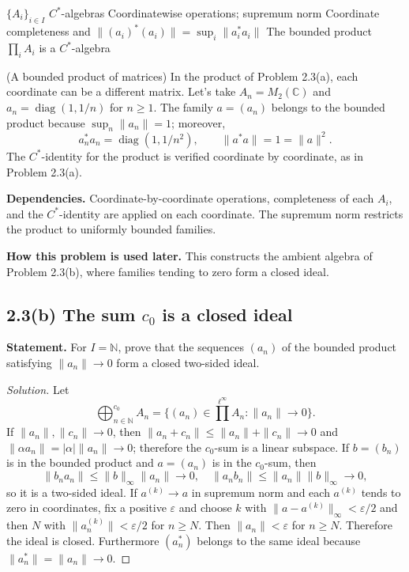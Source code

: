 \proofdiagram
{$\{A_i\}_{i\in I}$ $C^*$-algebras}
{Coordinatewise operations; supremum norm}
{Coordinate completeness and $\|(a_i)^*(a_i)\|=\sup_i\|a_i^*a_i\|$}
{The bounded product $\prod_i A_i$ is a $C^*$-algebra}

\begin{cthejemplo}{(A bounded product of matrices)}
In the product of Problem 2.3(a), each coordinate can be a different matrix.
Let's take $A_n=M_2(\mathbb C)$ and $a_n=\operatorname{diag}(1,1/n)$ for $n\ge1$.
The family $a=(a_n)$ belongs to the bounded product because $\sup_n\|a_n\|=1$; moreover,
\[
 a_n^*a_n=\operatorname{diag}(1,1/n^2),
 \qquad \|a^*a\|=1=\|a\|^2.
\]
The $C^*$-identity for the product is verified coordinate by coordinate, as in Problem 2.3(a).
\end{cthejemplo}

\noindent\textbf{Dependencies.} Coordinate-by-coordinate operations, completeness of each $A_i$, and the $C^*$-identity are applied on each coordinate. The supremum norm restricts the product to uniformly bounded families.

\noindent\textbf{How this problem is used later.} This constructs the ambient algebra of Problem 2.3(b), where families tending to zero form a closed ideal.

\subsection*{2.3(b) The sum $c_0$ is a closed ideal}

\noindent\textbf{Statement.} For $I=\mathbb N$, prove that the sequences $(a_n)$ of the bounded product satisfying $\|a_n\|\to0$ form a closed two-sided ideal.

\begin{proof}[Solution]
Let
\[
\bigoplus_{n\in\mathbb N}^{c_0}A_n
=\{(a_n)\in\prod^{\ell^\infty}A_n:\|a_n\|\to0\}.
\]
If $\|a_n\|,\|c_n\|\to0$, then
$\|a_n+c_n\|\le\|a_n\|+\|c_n\|\to0$ and
$\|\alpha a_n\|=|\alpha|\|a_n\|\to0$; therefore the $c_0$-sum is a linear subspace.
If $b=(b_n)$ is in the bounded product and $a=(a_n)$ is in the $c_0$-sum, then
\[
\|b_na_n\|\le\|b\|_\infty\|a_n\|\to0,
\quad
\|a_nb_n\|\le\|a_n\|\|b\|_\infty\to0,
\]
so it is a two-sided ideal. If $a^{(k)}\to a$ in supremum norm and each $a^{(k)}$ tends to zero in
coordinates, fix a positive $\varepsilon$ and choose $k$ with
$\|a-a^{(k)}\|_\infty<\varepsilon/2$ and then $N$ with
$\|a_n^{(k)}\|<\varepsilon/2$ for $n\ge N$. Then $\|a_n\|<\varepsilon$ for $n\ge N$.
Therefore the ideal is closed.
Furthermore $(a_n^*)$ belongs to the same ideal because $\|a_n^*\|=\|a_n\|\to0$.
\end{proof}

